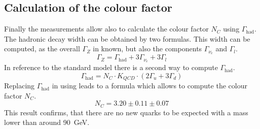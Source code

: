 \documentclass[epj,nopacs]{svjour}
\begin{document}
\subsection{Calculation of the colour factor}

Finally the measurements allow also to calculate the colour factor $N_C$ using
$Γ_{\mathrm{had}}$. The hadronic decay width can be obtained by two formulas.
This width can be computed, as the overall $Γ_Z$ in known, but also the components
$Γ_{ν_e}$ and $Γ_l$.
\begin{equation}
 Γ_Z = Γ_{\mathrm{had}} + 3Γ_{ν_e} + 3Γ_l
 \label{eqn:gammahad1}
\end{equation}
In reference to the standard model there is a second way to compute $Γ_{\mathrm{had}}$.
\begin{equation}
 Γ_{\mathrm{had}} = N_C \cdot K_{QCD}\cdot ( 2Γ_u + 3Γ_d )
 \label{eqn:gammahad2}
\end{equation}
Replacing $Γ_{\mathrm{had}}$ in  using  leads to a
formula which allows to compute the colour factor $N_C$.
\begin{equation}
 N_C = 3.20 \pm 0.11 \pm 0.07
\end{equation}
This result confirms, that there are no new quarks to be expected with a mass
lower than around \SI{90}{\GeV}.

\end{document}
